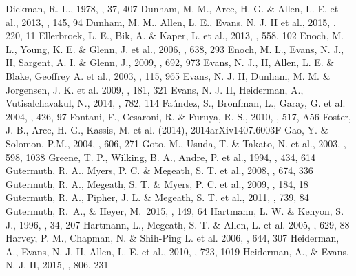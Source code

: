 \documentclass[iop]{emulateapj}
\begin{document}
\begin{thebibliography}{}
 Dickman, R. L., 1978, \apjs, 37, 407
 Dunham, M. M.,  Arce, H. G. \& Allen, L. E. et al., 2013, \aj, 145, 94
 Dunham, M. M., Allen, L. E., Evans, N. J. II et al., 2015, \apjs, 220, 11
 Ellerbroek, L. E.,  Bik, A. \& Kaper, L. et al., 2013, \aap, 558, 102
 Enoch, M. L., Young, K. E. \& Glenn, J. et al., 2006, \apjs, 638, 293
 Enoch, M. L., Evans, N. J., II, Sargent, A. I. \& Glenn, J., 2009, \apj, 692, 973
 Evans, N. J., II, Allen, L. E. \& Blake, Geoffrey A. et al.,  2003, \pasp, 115, 965
 Evans, N. J. II, Dunham, M. M. \& Jorgensen, J. K. et al. 2009, \apjs, 181, 321
 Evans, N. J. II, Heiderman, A., Vutisalchavakul, N., 2014, \apj, 782, 114
{ Fa\'undez, S., Bronfman, L., Garay, G. et al. 2004, \aap,
426, 97}
 Fontani, F., Cesaroni, R. \& Furuya, R. S., 2010, \aap, 517, A56
 Foster, J. B., Arce, H. G., Kassis, M. et al. (2014), 2014arXiv1407.6003F
 Gao, Y. \& Solomon, P.M., 2004, \apj, 606, 271
 Goto, M., Usuda, T. \& Takato, N. et al., 2003, \apj, 598, 1038
 Greene, T. P., Wilking, B. A., Andre, P. et al., 1994, \apj, 434, 614
 Gutermuth, R. A., Myers, P. C. \& Megeath, S. T. et al., 2008, \aj, 674, 336
 Gutermuth, R. A., Megeath, S. T. \& Myers, P. C. et al., 2009, \apjs, 184, 18
 Gutermuth, R. A., Pipher, J. L. \& Megeath, S. T. et al., 2011, \aj, 739, 84
 Gutermuth, R.~A., \& Heyer, M.\ 2015, \aj, 149, 64 
 Hartmann, L. W. \& Kenyon, S. J., 1996, \araa, 34, 207
 Hartmann, L., Megeath, S. T. \& Allen, L. et al. 2005, \apj, 629, 88
 Harvey, P. M., Chapman, N. \& Shih-Ping L. et al. 2006, \apj, 644, 307
 Heiderman, A., Evans, N. J. II, Allen, L. E. et al., 2010, \apj, 723, 1019
 Heiderman, A., \& Evans, N. J. II, 2015, \apj, 806, 231

\end{thebibliography}
\end{document}
